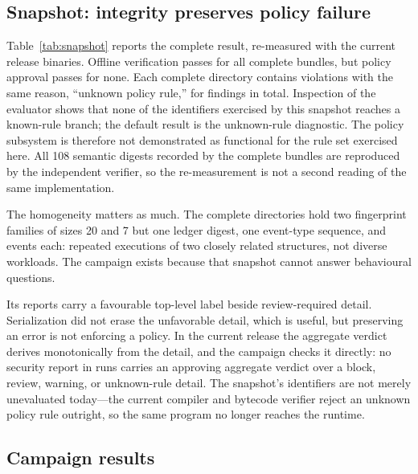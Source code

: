 \documentclass[conference]{IEEEtran}
\begin{document}
\subsection{Snapshot: integrity preserves policy failure}

Table~\ref{tab:snapshot} reports the complete result, re-measured with the
current release binaries.  Offline verification passes for all
\snapshotComplete{} complete bundles, but policy approval passes for none.
Each complete directory contains \snapshotUnknownPerDir{} violations with the
same reason, ``unknown policy rule,'' for \snapshotUnknownTotal{} findings in
total.  Inspection of the evaluator shows that none of the
\snapshotUnknownPerDir{} identifiers exercised by this snapshot reaches a
known-rule branch; the default result is the unknown-rule diagnostic.  The
policy subsystem is therefore not demonstrated as functional for the rule set
exercised here.  All 108 semantic digests recorded by the complete bundles are
reproduced by the independent verifier, so the re-measurement is not a second
reading of the same implementation.



The homogeneity matters as much.  The \snapshotComplete{} complete directories
hold two fingerprint families of sizes 20 and 7 but one ledger digest, one
event-type sequence, and \snapshotEvents{} events each: repeated executions of
two closely related structures, not \snapshotComplete{} diverse workloads.  The
campaign exists because that snapshot cannot answer behavioural questions.

Its reports carry a favourable top-level label beside review-required detail.
Serialization did not erase the unfavorable detail, which is useful, but
preserving an error is not enforcing a policy.  In the current release the
aggregate verdict derives monotonically from the detail, and the campaign checks
it directly: no security report in \campaignRows{} runs carries an approving
aggregate verdict over a block, review, warning, or unknown-rule detail.  The
snapshot's \snapshotUnknownPerDir{} identifiers are not merely unevaluated
today---the current compiler and bytecode verifier reject an unknown policy rule
outright, so the same program no longer reaches the runtime.

\subsection{Campaign results}
\end{document}

